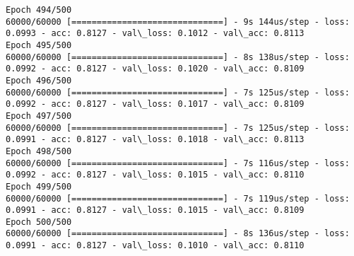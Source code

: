 \documentclass[11pt]{article}
\begin{document}
\begin{Verbatim}[commandchars=\\\{\}]
Epoch 494/500
60000/60000 [==============================] - 9s 144us/step - loss: 0.0993 - acc: 0.8127 - val\_loss: 0.1012 - val\_acc: 0.8113
Epoch 495/500
60000/60000 [==============================] - 8s 138us/step - loss: 0.0992 - acc: 0.8127 - val\_loss: 0.1020 - val\_acc: 0.8109
Epoch 496/500
60000/60000 [==============================] - 7s 125us/step - loss: 0.0992 - acc: 0.8127 - val\_loss: 0.1017 - val\_acc: 0.8109
Epoch 497/500
60000/60000 [==============================] - 7s 125us/step - loss: 0.0991 - acc: 0.8127 - val\_loss: 0.1018 - val\_acc: 0.8113
Epoch 498/500
60000/60000 [==============================] - 7s 116us/step - loss: 0.0992 - acc: 0.8127 - val\_loss: 0.1015 - val\_acc: 0.8110
Epoch 499/500
60000/60000 [==============================] - 7s 119us/step - loss: 0.0991 - acc: 0.8127 - val\_loss: 0.1015 - val\_acc: 0.8109
Epoch 500/500
60000/60000 [==============================] - 8s 136us/step - loss: 0.0991 - acc: 0.8127 - val\_loss: 0.1010 - val\_acc: 0.8110

    \end{Verbatim}
\end{document}
